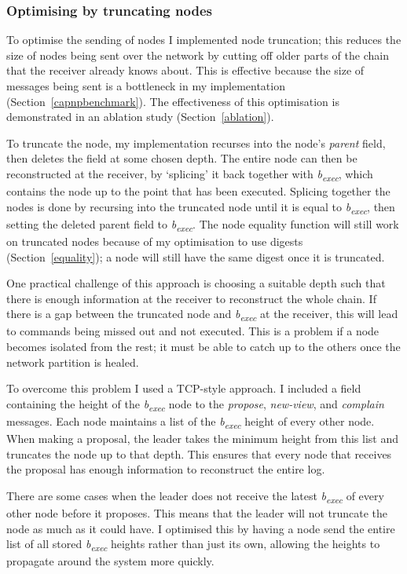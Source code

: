 \subsubsection{Optimising by truncating nodes} \label{truncation}
To optimise the sending of nodes I implemented node truncation; this reduces the size of nodes being sent over the network by cutting off older parts of the chain that the receiver already knows about. This is effective because the size of messages being sent is a bottleneck in my implementation (Section~\ref{capnpbenchmark}). The effectiveness of this optimisation is demonstrated in an ablation study (Section~\ref{ablation}).

To truncate the node, my implementation recurses into the node's \textit{parent} field, then deletes the field at some chosen depth. The entire node can then be reconstructed at the receiver, by `splicing' it back together with \textit{b\textsubscript{exec}}, which contains the node up to the point that has been executed. Splicing together the nodes is done by recursing into the truncated node until it is equal to \textit{b\textsubscript{exec}}, then setting the deleted parent field to \textit{b\textsubscript{exec}}. The node equality function will still work on truncated nodes because of my optimisation to use digests (Section~\ref{equality}); a node will still have the same digest once it is truncated.

One practical challenge of this approach is choosing a suitable depth such that there is enough information at the receiver to reconstruct the whole chain. If there is a gap between the truncated node and \textit{b\textsubscript{exec}} at the receiver, this will lead to commands being missed out and not executed. This is a problem if a node becomes isolated from the rest; it must be able to catch up to the others once the network partition is healed.

To overcome this problem I used a TCP-style approach. I included a field containing the height of the \textit{b\textsubscript{exec}} node to the \textit{propose}, \textit{new-view}, and \textit{complain} messages. Each node maintains a list of the \textit{b\textsubscript{exec}} height of every other node. When making a proposal, the leader takes the minimum height from this list and truncates the node up to that depth. This ensures that every node that receives the proposal has enough information to reconstruct the entire log.

There are some cases when the leader does not receive the latest \textit{b\textsubscript{exec}} of every other node before it proposes. This means that the leader will not truncate the node as much as it could have. I optimised this by having a node send the entire list of all stored \textit{b\textsubscript{exec}} heights rather than just its own, allowing the heights to propagate around the system more quickly.

